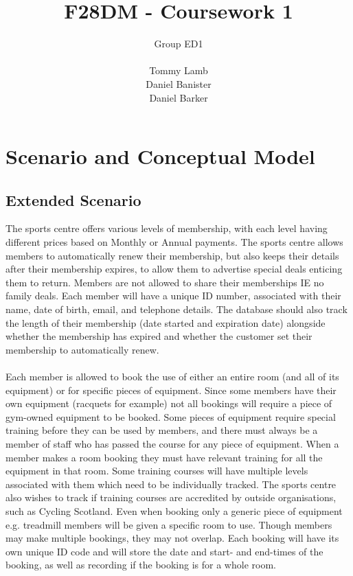\documentclass[a4paper, titlepage]{article}
\begin{document}
	\title{F28DM - Coursework 1}
	\author{{\Large Group ED1}\\\\Tommy Lamb\\ Daniel Banister\\ Daniel Barker}
	\maketitle
	\tableofcontents
	\clearpage
	
	\section{Scenario and Conceptual Model} \label{sec:scenario}
	\subsection{Extended Scenario}
	The sports centre offers various levels of membership, with each level having different prices based on Monthly or Annual payments. The sports centre allows members to automatically renew their membership, but also keeps their details after their membership expires, to allow them to advertise special deals enticing them to return. Members are not allowed to share their memberships IE no family deals. Each member will have a unique ID number, associated with their name, date of birth, email, and telephone details. The database should also track the length of their  membership (date started and expiration date) alongside whether the membership has expired and whether the customer set their membership to automatically renew.
	\\\\
	Each member is allowed to book the use of either an entire room (and all of its equipment) or for specific pieces of equipment. Since some members have their own equipment (racquets for example) not all bookings will require a piece of gym-owned equipment to be booked. Some pieces of equipment require special training before they can be used by members, and there must always be a member of staff who has passed the course for any piece of equipment. When a member makes a room booking they must have relevant training for all the equipment in that room. Some training courses will have multiple levels associated with them which need to be individually tracked. The sports centre also wishes to track if training courses are accredited by outside organisations, such as Cycling Scotland. Even when booking only a generic piece of equipment e.g. treadmill members will be given a specific room to use. Though members may make multiple bookings, they may not overlap. Each booking will have its own unique ID code and will store the date and start- and end-times of the booking, as well as recording if the booking is for a whole room. 
\end{document}
